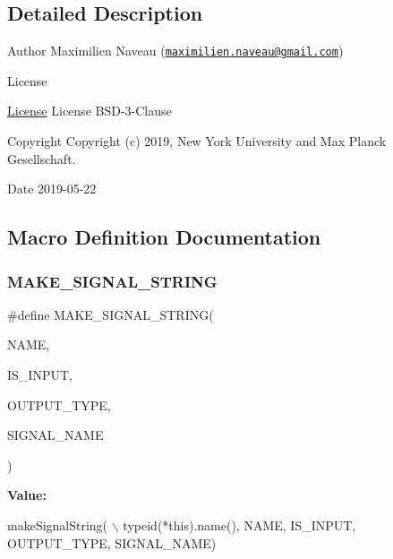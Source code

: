\subsection{Detailed Description}
\begin{DoxyAuthor}{Author}
Maximilien Naveau (\href{mailto:maximilien.naveau@gmail.com}{\tt maximilien.\+naveau@gmail.\+com}) 
\end{DoxyAuthor}
\begin{DoxyRefDesc}{License}
\item[\hyperlink{license__license000019}{License}]License B\+S\+D-\/3-\/\+Clause \end{DoxyRefDesc}
\begin{DoxyCopyright}{Copyright}
Copyright (c) 2019, New York University and Max Planck Gesellschaft. 
\end{DoxyCopyright}
\begin{DoxyDate}{Date}
2019-\/05-\/22 
\end{DoxyDate}


\subsection{Macro Definition Documentation}
\mbox{\label{dg__to__ros_8hh_ade0f70d8d762df505413a17bdbbe5eb0}} 
\subsubsection{\texorpdfstring{M\+A\+K\+E\+\_\+\+S\+I\+G\+N\+A\+L\+\_\+\+S\+T\+R\+I\+NG}{MAKE\_SIGNAL\_STRING}}
{\footnotesize\ttfamily \#define M\+A\+K\+E\+\_\+\+S\+I\+G\+N\+A\+L\+\_\+\+S\+T\+R\+I\+NG(\begin{DoxyParamCaption}\item[{}]{N\+A\+ME,  }\item[{}]{I\+S\+\_\+\+I\+N\+P\+UT,  }\item[{}]{O\+U\+T\+P\+U\+T\+\_\+\+T\+Y\+PE,  }\item[{}]{S\+I\+G\+N\+A\+L\+\_\+\+N\+A\+ME }\end{DoxyParamCaption})}

{\bfseries Value\+:}
\begin{DoxyCode}
makeSignalString(                                                \(\backslash\)
        \textcolor{keyword}{typeid}(*this).name(), NAME, IS\_INPUT, OUTPUT\_TYPE, SIGNAL\_NAME)
\end{DoxyCode}
